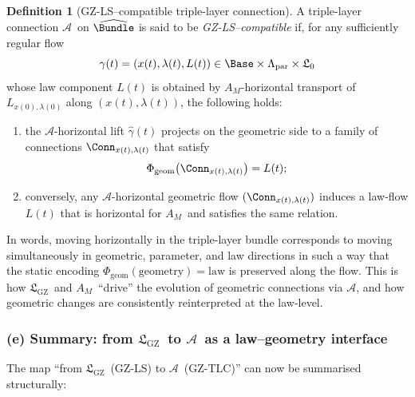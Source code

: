 \documentclass[11pt]{book}
\theoremstyle{plain}
\theoremstyle{definition}
\newtheorem{definition}[theorem]{Definition} \theoremstyle{remark}
\newcommand{\GZLStxt}{\textsf{GZ-LS}}   \newcommand{\GZLTtxt}{\textsf{GZ-LT}}   \newcommand{\GZLOCtxt}{\textsf{GZ-LOC}} \newcommand{\GZLCurvtxt}{\textsf{GZ-LCurv}}
\newcommand{\GZLS}{\ensuremath{\mathfrak{L}_{\mathrm{GZ}}}}       \newcommand{\GZLT}{\ensuremath{M_{!w}}}                           \newcommand{\GZLOC}{\ensuremath{A_M}}                             \newcommand{\GZLCurv}{\ensuremath{\mathcal{F}_{\mathrm{law}}}}
\newcommand{\GZTLCtxt}{\textsf{GZ-TLC}}                           \newcommand{\GZTLC}{\ensuremath{\mathcal{A}}}                     \newcommand{\GZGMS}{\textsf{GZ-GMS}}
\begin{document}
\begin{definition}[GZ-LS–compatible triple-layer connection]
A triple-layer connection \GZTLC\ on $\widehat{\Bundle}$ is said to be
  \emph{GZ-LS–compatible} if, for any sufficiently regular flow
  \[
     \gamma(t)
       = (x(t),\lambda(t),L(t))
       \in \Base\times\Lambda_{\mathrm{par}}\times\mathfrak{L}_0
  \]
  whose law component $L(t)$ is obtained by \GZLOC-horizontal transport
  of $L_{x(0),\lambda(0)}$ along $(x(t),\lambda(t))$, the following
  holds:
  \begin{enumerate}[label=\roman*)]
    \item the \GZTLC-horizontal lift $\widehat{\gamma}(t)$ projects on
          the geometric side to a family of connections
          $\Conn_{x(t),\lambda(t)}$ that satisfy
          \[
             \Phi_{\mathrm{geom}}\bigl(\Conn_{x(t),\lambda(t)}\bigr)
             = L(t);
          \]
    \item conversely, any \GZTLC-horizontal geometric flow
          $(\Conn_{x(t),\lambda(t)})$ induces a law-flow $L(t)$ that is
          horizontal for \GZLOC\ and satisfies the same relation.
  \end{enumerate}
\end{definition}

In words, moving horizontally in the triple-layer bundle corresponds to
moving simultaneously in geometric, parameter, and law directions in
such a way that the static encoding
$\Phi_{\mathrm{geom}}(\text{geometry}) = \text{law}$ is preserved along
the flow. This is how \GZLS\ and \GZLOC\ “drive” the evolution of
geometric connections via \GZTLC, and how geometric changes are
consistently reinterpreted at the law-level.



\subsubsection*{(e) Summary: from \GZLS\ to \GZTLC\ as a law–geometry interface}

The map “from \GZLS\ (\GZLStxt) to \GZTLC\ (\GZTLCtxt)” can now be
summarised structurally:
\end{document}

